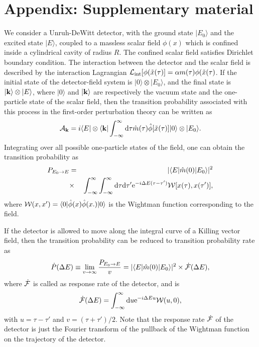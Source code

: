 \documentclass[aps,prl,nofootinbib,preprintnumbers,floatfix,twocolumn,superscriptaddress]{revtex4}
\def\nn{\nonumber}
\def\nn{\nonumber}
\def\d{{\rm d}}
\def\f{\frac}
\def\e{{\rm e}}
\begin{document}
\section{Appendix: Supplementary material}
We consider a Unruh-DeWitt detector, with the ground state $|E_0\rangle$ and the 
excited state $|E\rangle$, coupled to a massless scalar field $\phi(x)$ 
which is confined inside a cylindrical cavity of radius $R$. The confined scalar field 
satisfies Dirichlet boundary condition. The interaction 
between the detector and the scalar field is described by the interaction Lagrangian 
${\cal L}_{\rm int}[\phi({\tilde x}(\tau)]=\alpha m(\tau) \phi({\tilde x}(\tau)$.
If the initial state of the detector-field system is $|0\rangle \otimes |E_0\rangle$, and 
the final state is $|{\bf k}\rangle \otimes |E\rangle$, where $|0\rangle$ and 
$|{\bf k}\rangle$ are respectively the vacuum state and the one-particle state of 
the scalar field, then the transition probability associated with this process in 
the first-order perturbation theory can be written as 
\begin{equation}
 {\cal A}_{\bf k}=i \langle E| \otimes \langle {\bf k}| 
 \int_{-\infty}^{\infty} \d \tau {\hat m}(\tau) {\hat \phi}[{\tilde x}(\tau)] 
 |0\rangle \otimes |E_0\rangle.
\end{equation}
Integrating over all possible one-particle states of the field, one can obtain the 
transition probability as 
\begin{eqnarray}
 P_{E_0 \to E}&=&|\langle E|{\hat m}(0)|E_0\rangle|^2 \\
 &\times& \int_{-\infty}^{\infty} 
 \int_{-\infty} ^{\infty} \d \tau \d \tau' \e^{-i\Delta E (\tau-\tau')} 
 {\cal W}[x(\tau),x(\tau')], \nn 
\end{eqnarray}
where ${\cal W}(x,x')=\langle 0| {\hat \phi}(x) {\hat \phi}(x.) |0\rangle$ is the 
Wightman function corresponding to the field. 

If the detector is allowed to move along the integral curve of a Killing vector field, 
then the transition probability can be reduced to transition probability rate as 
\begin{eqnarray}
 {\dot P}(\Delta E) \equiv \lim_{v \to \infty} \f{P_{E_0 \to E}}{v}
 =|\langle E|{\hat m}(0)|E_0\rangle|^2 \times {\dot {\cal F}}(\Delta E),
\end{eqnarray}
where ${\dot {\cal F}}$ is called as response rate of the detector, and is 
\begin{eqnarray}
 {\dot {\cal F}}(\Delta E)=\int_{-\infty}^{\infty} \d u \e^{-i\Delta Eu} 
 {\cal W}(u,0),
\end{eqnarray}
with $u=\tau-\tau'$ and $v=(\tau+\tau')/2$. Note that the response rate 
${\dot {\cal F}}$ of the detector is just the Fourier transform of the 
pullback of the Wightman function on the trajectory of the detector.
\end{document}
